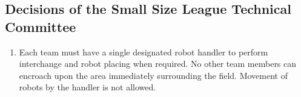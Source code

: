 \subsection*{Decisions of the Small Size League Technical Committee}
\begin{enumerate}
\item
Each team must have a single designated robot handler to perform interchange and robot placing when required.
No other team members can encroach upon the area immediately surrounding the field.
Movement of robots by the handler is not allowed.
\end{enumerate}
